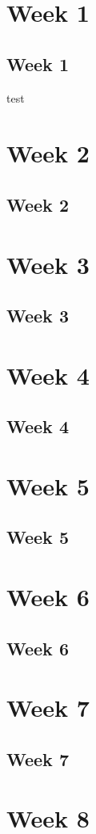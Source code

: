 \chapter{Week 1}
\section{Week 1}
test
\chapter{Week 2}
\section{Week 2}
\chapter{Week 3}
\section{Week 3}
\chapter{Week 4}
\section{Week 4}
\chapter{Week 5}
\section{Week 5}
\chapter{Week 6}
\section{Week 6}
\chapter{Week 7}
\section{Week 7}
\chapter{Week 8}
